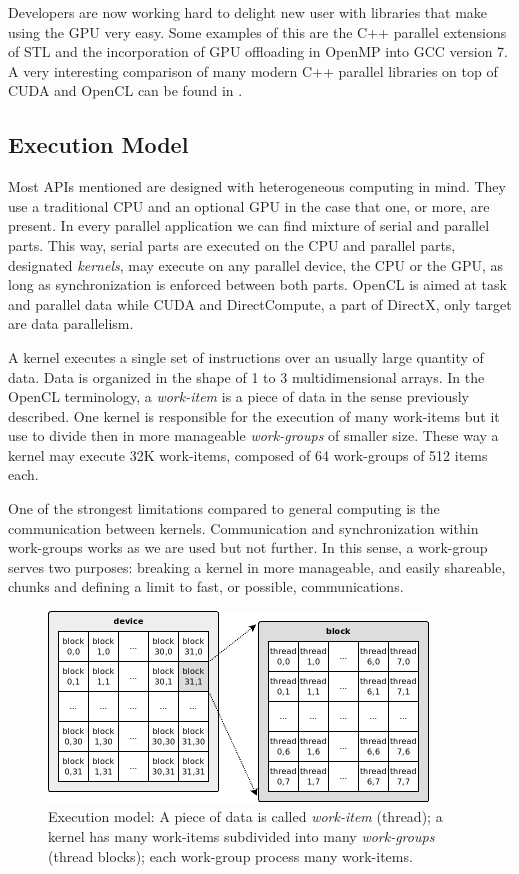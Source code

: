 \documentclass{article}
\begin{document}
Developers are now working hard to delight new user with libraries that make using the GPU very easy. Some examples of this are the C++ parallel extensions of STL and the incorporation of GPU offloading in OpenMP into GCC version 7. A very interesting comparison of many modern C++ parallel libraries on top of CUDA and OpenCL can be found in \cite{doi:10.1137/120903683}.

\subsection{Execution Model}

Most APIs mentioned are designed with heterogeneous computing in
mind. They use a traditional CPU and an optional GPU in the case that
one, or more, are present. In every parallel application we can find
mixture of serial and parallel parts. This way, serial parts are
executed on the CPU and parallel parts, designated \textit{kernels},
may execute on any parallel device, the CPU or the GPU, as long as
synchronization is enforced between both parts. OpenCL is aimed at
task and parallel data while CUDA and DirectCompute, a part of
DirectX, only target are data parallelism.

A kernel executes a single set of instructions over an usually large
quantity of data. Data is organized in the shape of 1 to 3
multidimensional arrays. In the OpenCL terminology, a
\textit{work-item} is a
piece of data in the sense previously described. One kernel is
responsible for the execution of many work-items but it use to divide
then in more manageable \textit{work-groups} of smaller size. These
way a kernel may execute 32K work-items, composed of 64 work-groups of
512 items each.

One of the strongest limitations compared to general computing is the
communication between kernels. Communication and synchronization
within work-groups works as we are used but not further. In this
sense, a work-group serves two purposes: breaking a kernel in more
manageable, and easily shareable, chunks and defining a limit to fast, or
possible, communications.

\begin{figure}[!ht]
\centering
\includegraphics[width=0.9\textwidth]{grid}
\caption{Execution model: A piece of data is called {\it work-item} (thread); a kernel has many work-items subdivided into many {\it work-groups} (thread blocks); each work-group process many work-items.}
\label{figure:grid}
\end{figure}
\end{document}
